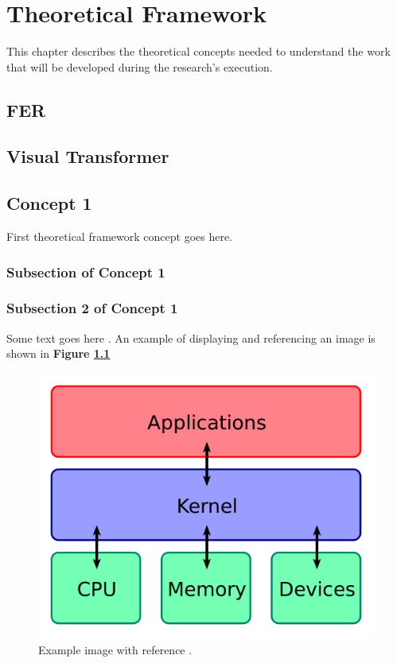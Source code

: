 \chapter{Theoretical Framework}
\label{chapter:theoretical-framework}


This chapter describes the theoretical concepts needed to understand the work that will be developed during the research's execution.


\section{FER}

\section{Visual Transformer}

\section{Concept 1}

\label{section:Concept1}

First theoretical framework concept goes here.

\subsection{Subsection of Concept 1} 
\subsection{Subsection 2 of Concept 1}
Some text goes here \cite{examplereference}. An example of displaying and referencing an image is shown in \textbf{Figure \ref{fig:example}}


\begin{figure}
	\begin{center}
		\includegraphics[width=1\columnwidth]{../img/image.png}
		\caption[]{Example image with reference \cite{examplereference}.}
		\label{fig:example}
	\end{center}
\end{figure}


